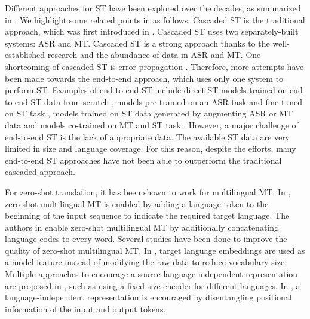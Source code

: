 \documentclass[conference]{IEEEtran}
\begin{document}
	Different approaches for ST have been explored over the decades, as summarized in \cite{sperber-paulik-2020-speech}. We highlight some related points in \cite{sperber-paulik-2020-speech} as follows. Cascaded ST is the traditional approach, which was first introduced in \cite{IntroCascade}. Cascaded ST uses two separately-built systems: ASR and MT. Cascaded ST is a strong approach thanks to the well-established research and the abundance of data in ASR and MT. One shortcoming of cascaded ST is error propagation \cite{CascadedError}. Therefore, more attempts have been made towards the end-to-end approach, which uses only one system to perform ST. Examples of end-to-end ST include direct ST models trained on end-to-end ST data from scratch \cite{ExampleDirect}, models pre-trained on an ASR task and fine-tuned on ST task \cite{bansal-etal-2019-pre}, models trained on ST data generated by augmenting ASR or MT data \cite{jia2019leveraging, pino2019harnessing} and models co-trained on MT and ST task \cite{tang2021general}. However, a major challenge of end-to-end ST is the lack of appropriate data. The available ST data are very limited in size and language coverage. For this reason, despite the efforts, many end-to-end ST approaches have not been able to outperform the traditional cascaded approach.
	
	
	For zero-shot translation, it has been shown to work for multilingual  MT. In \cite{googleNMT}, zero-shot multilingual MT is enabled by adding a language token to the beginning of the input sequence to indicate the required target language. The authors in \cite{ZSha2016} enable zero-shot multilingual MT by additionally concatenating language codes to every word. Several studies have been done to improve the quality of zero-shot multilingual MT. In \cite{ZSha2017}, target language embeddings are used as a model feature instead of modifying the raw data to reduce vocabulary size. Multiple approaches to encourage a source-language-independent representation are proposed in \cite{ZS-Quan}, such as using a fixed size encoder for different languages. In \cite{DEPI}, a language-independent representation is encouraged by disentangling positional information of the input and output tokens.
	
\end{document}

